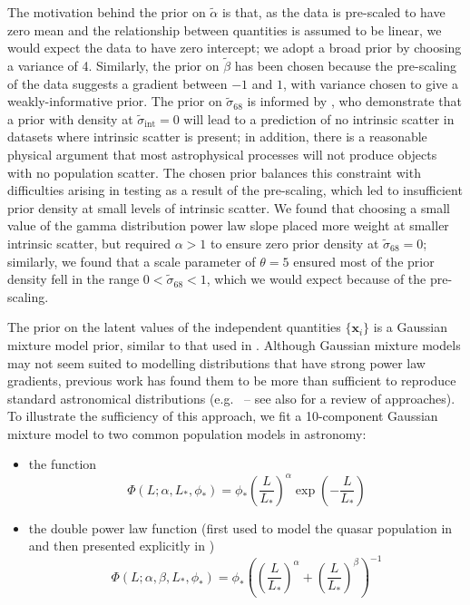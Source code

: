 \documentclass[fleqn,usenatbib]{rasti}
\newcommand{\indepvars}{\boldsymbol{x}_i}
\newcommand{\intercept}{\alpha}
\begin{document}
The motivation behind the prior on $\tilde{\intercept}$ is that, as the data is
pre-scaled to have zero mean and the relationship between quantities is assumed
to be linear, we would expect the data to have zero intercept; we adopt a broad
prior by choosing a variance of 4. Similarly, the prior on $\tilde{\beta}$ has
been chosen because the pre-scaling of the data suggests a gradient between $-1$
and $1$, with variance chosen to give a weakly-informative prior. The prior on
$\tilde{\sigma}_{68}$ is informed by \citet{Chung:2013}, who demonstrate that a
prior with density at $\tilde{\sigma}_{\text{int}} = 0$ will lead to a
prediction of no intrinsic scatter in datasets where intrinsic scatter is
present; in addition, there is a reasonable physical argument that most
astrophysical processes will not produce objects with no population scatter. The
chosen prior balances this constraint with difficulties arising in testing as a
result of the pre-scaling, which led to insufficient prior density at small
levels of intrinsic scatter. We found that choosing a small value of the gamma
distribution power law slope placed more weight at smaller intrinsic scatter,
but required $\alpha > 1$ to ensure zero prior density at $\tilde{\sigma}_{68} =
0$; similarly, we found that a scale parameter of $\theta = 5$ ensured most of
the prior density fell in the range $0 < \tilde{\sigma}_{68} < 1$, which we
would expect because of the pre-scaling.

The prior on the latent values of the independent quantities $\{\indepvars\}$ is
a Gaussian mixture model prior, similar to that used in \citet{Kelly:2007}.
Although Gaussian mixture models may not seem suited to modelling distributions
that have strong power law gradients, previous work has found them to be more
than sufficient to reproduce standard astronomical distributions (e.g.\
\citealt{Blanton:2003, Kelly:2008} -- see also \citealt{Johnston:2011} for a
review of approaches). To illustrate the sufficiency of this approach, we fit a
10-component Gaussian mixture model to two common population models in
astronomy:
\begin{itemize}
    \item the \citet{Schechter:1976} function
    \begin{equation}
        \Phi(L; \alpha, L_*, \phi_*)
          = \phi_* \left(\frac{L}{L_*}\right)^\alpha
            \exp \left(-\frac{L}{L_*}\right)
    \end{equation}
    \item the double power law function (first used to model the quasar
    population in \citealt{Boyle:1987} and then presented explicitly in
    \citealt{Boyle:1988})
    \begin{equation}
        \Phi(L; \alpha, \beta, L_*, \phi_*)
          = \phi_* \left(\left(\frac{L}{L_*}\right)^\alpha
             + \left(\frac{L}{L_*}\right)^\beta\right)^{-1}
    \end{equation}
\end{itemize}
\end{document}
